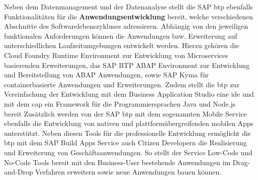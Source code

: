 Neben dem Datenmanagement und der Datenanalyse stellt die SAP \ac{btp} ebenfalls Funktionalitäten für die \textbf{Anwendungsentwicklung} bereit, welche verschiedenen Abschnitte des Softwarelebenszykluses adressieren. Abhängig von den jeweiligen funktionalen Anforderungen können die Anwendungen bzw. Erweiterung auf unterschiedlichen Laufzeitumgebungen entwickelt werden. Hierzu gehören die Cloud Foundry Runtime Environment zur Entwicklung von Microservices basierenden Erweiterungen, das SAP BTP ABAP Environment zur Entwicklung und Bereitstellung von ABAP Anwendungen, sowie SAP Kyma für containerbasierte Anwendungen und Erweiterungen. Zudem stellt die \ac{btp} zur Vereinfachung der Entwicklung mit dem Business Application Studio eine \ac{ide} und mit dem \ac{cap} ein Framework für die Programmiersprachen Java und Node.js bereit \autocite[Vgl.][S. 67-69]{SEUBERT} Zusätzlich werden von der SAP \ac{btp} mit dem sogenannten Mobile Service ebenfalls die Entwicklung von nativen und plattformübergreifenden mobilen Apps unterstützt. \autocite[Vgl.][S. 217-219]{SEUBERT} Neben diesen Tools für die professionelle Entwicklung ermöglicht die \ac{btp} mit dem SAP Build Apps Service auch Citizen Developern die Realisierung und Erweiterung von Geschäftsanwendungen. So stellt der Service Low-Code und No-Code Tools bereit mit den Business-User bestehende Anwendungen im Drag-and-Drop Verfahren erweitern sowie neue Anwendungen bauen können. \autocite[Vgl.][S. 4]{SAPBUILDAPPS}


